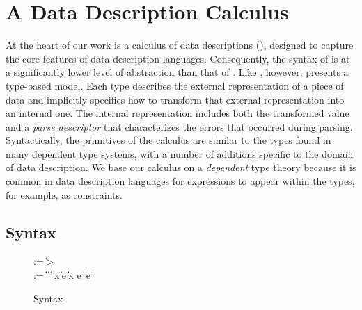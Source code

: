 \section{A Data Description Calculus}
\label{sec:ddc}

At the heart of our work is a calculus of data descriptions (\ddc{}),
designed to capture the core features of data description languages.
Consequently, the syntax of \ddc{} is at a significantly lower level
of abstraction than that of \ipads{}.  Like \ipads{}, however, \ddc{}
presents a type-based model.  Each \ddc{} type describes the external
representation of a piece of data and implicitly specifies how to
transform that external representation into an internal one.  The
internal representation includes both the transformed value and a
\textit{parse descriptor} that characterizes the errors that occurred
during parsing. Syntactically, the primitives of the calculus are
similar to the types found in many dependent type systems, with a
number of additions specific to the domain of data description.
We base our calculus on a \textit{dependent} type theory because it is
common in data description languages for expressions to appear within
the types, for example, as constraints.


\subsection{\ddc{} Syntax}
\begin{figure}
{\small
\begin{bnf}
   \meta{\gk} \::= \kty \| \ity \-> \gk 
                               \pext{\| \gk \-> \gk} \\
   \meta{\ty} \::= 
    \ptyvar \| \ptrue\| \pfalse \|  \| 
    \plam{\var}{\ity}{\ty} \|  \nlalt
    \psig x \ty \ty \| \psum \ty e \ty \| \pand \ty \ty \|
    \pset x \ty e \| \pseq \ty {} \nlalt
    \pmu{\ptyvar}{\ty} \| \pcompute e \ity \| \pabsorb \ty \| \pscan{\ty} 
\end{bnf}
}
\caption{\ddc{} Syntax}
\label{fig:ddc-syntax}
\end{figure}

